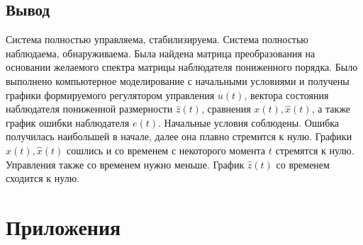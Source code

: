 \documentclass[a4paper, 12pt]{article}
\begin{document}
    \subsection{Вывод}
    Система полностью управляема, стабилизируема. Система полностью наблюдаема,
    обнаруживаема. Была найдена матрица преобразования на основании желаемого спектра
    матрицы наблюдателя пониженного порядка. Было выполнено компьютерное моделирование
    с начальными условиями и получены графики формируемого регулятором управления $u(t)$,
    вектора состояния наблюдателя пониженной размерности $\hat{z}(t)$, сравнения $x(t),\hat{x}(t)$,
    а также график ошибки наблюдателя $e(t)$. Начальные условия соблюдены. Ошибка получилась наибольшей в начале, далее
    она плавно стремится к нулю. Графики $x(t),\hat{x}(t)$ сошлись и со временем с некоторого
    момента $t$ стремятся к нулю. Управления также со временем нужно меньше.
    График $\hat{z}(t)$ со временем сходится к нулю.
    \vfill


    \section{Приложения}
\end{document}
